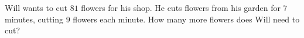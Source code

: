Will wants to cut $81$ flowers for his shop. He cuts flowers from his garden for $7$ minutes, cutting $9$ flowers each minute. How many more flowers does Will need to cut?
